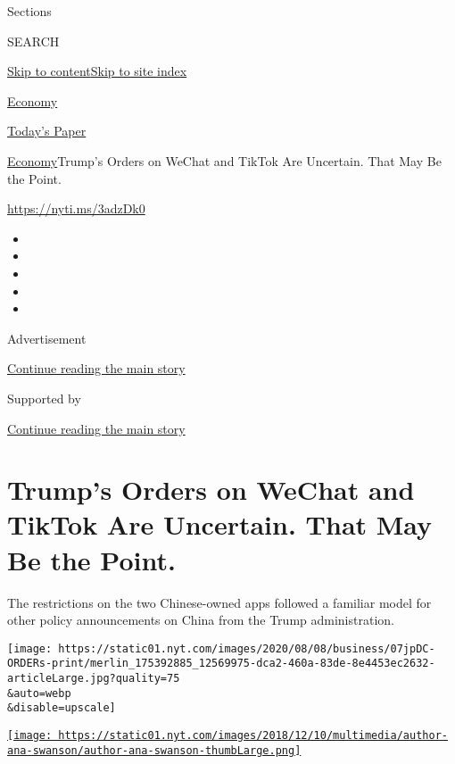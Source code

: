 Sections

SEARCH

\protect\hyperlink{site-content}{Skip to
content}\protect\hyperlink{site-index}{Skip to site index}

\href{https://www.nytimes.com/section/business/economy}{Economy}

\href{https://myaccount.nytimes.com/auth/login?response_type=cookie\&client_id=vi}{}

\href{https://www.nytimes.com/section/todayspaper}{Today's Paper}

\href{/section/business/economy}{Economy}\textbar{}Trump's Orders on
WeChat and TikTok Are Uncertain. That May Be the Point.

\href{https://nyti.ms/3adzDk0}{https://nyti.ms/3adzDk0}

\begin{itemize}
\item
\item
\item
\item
\item
\end{itemize}

Advertisement

\protect\hyperlink{after-top}{Continue reading the main story}

Supported by

\protect\hyperlink{after-sponsor}{Continue reading the main story}

\hypertarget{trumps-orders-on-wechat-and-tiktok-are-uncertain-that-may-be-the-point}{%
\section{Trump's Orders on WeChat and TikTok Are Uncertain. That May Be
the
Point.}\label{trumps-orders-on-wechat-and-tiktok-are-uncertain-that-may-be-the-point}}

The restrictions on the two Chinese-owned apps followed a familiar model
for other policy announcements on China from the Trump administration.

\texttt{[image: https://static01.nyt.com/images/2020/08/08/business/07jpDC-ORDERs-print/merlin\_175392885\_12569975-dca2-460a-83de-8e4453ec2632-articleLarge.jpg?quality=75\\\&auto=webp\\\&disable=upscale]}

\href{https://www.nytimes.com/by/ana-swanson}{\texttt{[image: https://static01.nyt.com/images/2018/12/10/multimedia/author-ana-swanson/author-ana-swanson-thumbLarge.png]}}


